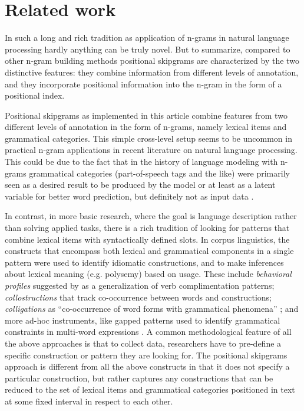 \documentclass[12pt]{article}
\begin{document}
\section{Related work}

In such a long and rich tradition as application of n-grams in natural
language processing hardly anything can be truly novel. But to
summarize, compared to other n-gram building methods positional
skipgrams are characterized by the two distinctive features:
they combine information from different levels of annotation, and they
incorporate positional information into the n-gram in the form of a
positional index. 

Positional skipgrams as implemented in this article combine features
from two different levels of annotation in the form of n-grams, namely
lexical items and grammatical categories. This simple cross-level
setup seems to be uncommon in practical n-gram applications in recent
literature on natural language processing. This could be due to the
fact that in the history of language modeling with n-grams grammatical
categories (part-of-speech tags and the like) were primarily seen as a
desired result to be produced by the model or at least as a latent
variable for better word prediction, but definitely not as input data
\autocite[see, for example,][]{brown1992class}.

In contrast, in more basic research, where the goal is language
description rather than solving applied tasks, there is a rich
tradition of looking for patterns that combine lexical items with
syntactically defined slots.  In corpus linguistics, the constructs
that encompass both lexical and grammatical components in a single
pattern were used to identify idiomatic constructions, and to make
inferences about lexical meaning (e.g. polysemy) based on usage. These
include \textit{behavioral profiles} suggested by
\textcite{hanks1996contextual} as a generalization of verb
complimentation patterns; \textit{collostructions}
\autocite{stefanowitsch2003collostructions} that track co-occurrence
between words and constructions; \textit{colligations} as
“co-occurrence of word forms with grammatical phenomena”
\autocite{gries2009behavioral}; and more ad-hoc instruments, like
gapped patterns used to identify grammatical constraints in multi-word
expressions \autocite{kopotev-etal-2013-automatic}.  A common
methodological feature of all the above approaches is that to collect
data, researchers have to pre-define a specific construction or
pattern they are looking for.  The positional skipgrams approach is
different from all the above constructs in that it does not specify a
particular construction, but rather captures any constructions that
can be reduced to the set of lexical items and grammatical categories
positioned in text at some fixed interval in respect to each other.
\end{document}
